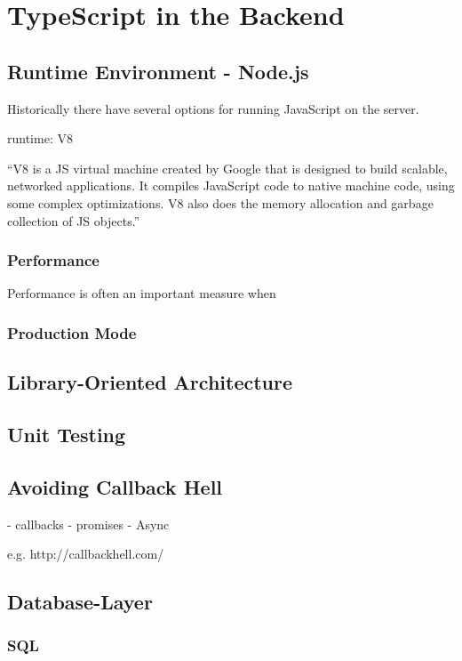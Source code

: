 \documentclass[12pt,a4paper]{report}
\begin{document}
\chapter{TypeScript in the Backend}

\section{Runtime Environment - Node.js}
Historically there have several options for running JavaScript on the server.

runtime: V8

``V8 is a JS virtual machine created by Google that is designed to build scalable, networked applications. It compiles JavaScript code to native machine code, using some complex optimizations. V8 also does the memory allocation and garbage collection of JS objects.''



\subsection{Performance}
Performance is often an important measure when

\subsection{Production Mode}

\section{Library-Oriented Architecture}

\section{Unit Testing}

\section{Avoiding Callback Hell}

- callbacks
- promises
- Async

e.g. http://callbackhell.com/



\section{Database-Layer}

\subsection{SQL}
\end{document}
